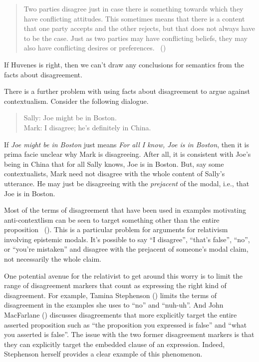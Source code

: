 \documentclass[
  11pt,
  letterpaper,
  DIV=11,
  numbers=noendperiod,
  twoside]{scrartcl}
\begin{document}
\begin{quote}
Two parties disagree just in case there is something towards which they
have conflicting attitudes. This sometimes means that there is a content
that one party accepts and the other rejects, but that does not always
have to be the case. Just as two parties may have conflicting beliefs,
they may also have conflicting desires or preferences.
~()
\end{quote}

If Huvenes is right, then we can't draw any conclusions for semantics
from the facts about disagreement.

There is a further problem with using facts about disagreement to argue
against contextualism. Consider the following dialogue.

\begin{quote}
Sally: Joe might be in Boston.\\
Mark: I disagree; he's definitely in China.
\end{quote}

If \emph{Joe might be in Boston} just means \emph{For all I know, Joe is
in Boston}, then it is prima facie unclear why Mark is disagreeing.
After all, it is consistent with Joe's being in China that for all Sally
knows, Joe is in Boston. But, say some contextualists, Mark need not
disagree with the whole content of Sally's utterance. He may just be
disagreeing with the \emph{prejacent} of the modal, i.e., that Joe is in
Boston.

Most of the terms of disagreement that have been used in examples
motivating anti-contextlism can be seen to target something other than
the entire proposition ~(). This is a particular problem for arguments for
relativism involving epistemic modals. It's possible to say ``I
disagree'', ``that's false'', ``no'', or ``you're mistaken'' and
disagree with the prejacent of someone's modal claim, not necessarily
the whole claim.

One potential avenue for the relativist to get around this worry is to
limit the range of disagreement markers that count as expressing the
right kind of disagreement. For example, Tamina Stephenson
() limits the terms of disagreement
in the examples she uses to ``no'' and ``nuh-uh''. And John MacFarlane
() discusses disagreements that
more explicitly target the entire asserted proposition such as ``the
proposition you expressed is false'' and ``what you asserted is false''.
The issue with the two former disagreement markers is that they can
explicitly target the embedded clause of an expression. Indeed,
Stephenson herself provides a clear example of this phenomenon.
\end{document}
